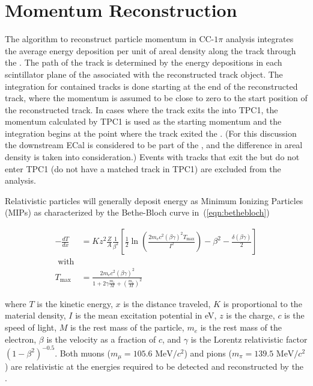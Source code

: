\section{Momentum Reconstruction}\label{subsec:MomRecon}

The algorithm to reconstruct particle momentum in CC-$1\pi$ analysis
integrates the average energy deposition per unit of areal density
along the track through the \podtext{}. The path of the track is determined
by the energy depositions in each scintillator plane of the \podtext{}
associated with the reconstructed track object. The integration for
contained tracks is done starting at the end of the reconstructed
track, where the momentum is assumed to be close to zero to the start
position of the reconstructed track. In cases where the track exits
the \podtext{} into TPC1, the momentum calculated by TPC1 is used as the
starting momentum and the integration begins at the point where the
track exited the \podtext{}. (For this discussion the downstream ECal is
considered to be part of the \podtext{}, and the difference in areal density
is taken into consideration.) Events with tracks that exit the \podtext{}
but do not enter TPC1 (do not have a matched track in TPC1) are
excluded from the analysis.


Relativistic particles will generally deposit energy as Minimum
Ionizing Particles (MIPs) as characterized by the Bethe-Bloch curve in~(\ref{eqn:bethebloch})

\begin{align}\label{eqn:bethebloch}
    -\frac{dT}{dx} &= K z^2\frac{Z}{A} \frac{1}{\beta^2}\left[\frac{1}{2}\ln\left(\frac{2 m_{e}c^{2}{(\beta\gamma)}^{2}T_\text{max}}{I^2}\right) - \beta^{2} - \frac{\delta\left(\beta\gamma\right)}{2}\right] \\
    \text{~with} \nonumber \\
    T_\text{max} &= \frac{2 m_{e}c^{2}{(\beta\gamma)}^{2}}{1+2\gamma \frac{m_e}{M} + {\left(\frac{m_e}{M}\right)}^2} \nonumber
\end{align}

\noindent{}where $T$ is the kinetic energy, $x$ is the distance
traveled, $K$ is proportional to the material density, $I$ is the mean
excitation potential in eV, $z$ is the charge, $c$ is the speed of
light, $M$ is the rest mass of the particle, $m_{e}$ is the rest mass
of the electron, $\beta$ is the velocity as a fraction of $c$, and
$\gamma$ is the Lorentz relativistic factor
${\left(1-\beta^{2}\right)}^{-0.5}$.  Both muons ($m_{\mu} =
105.6\text{~MeV}/c^{2}$) and pions ($m_{\pi} = 139.5
\text{~MeV}/c^{2}$) are relativistic at the energies required to be
detected and reconstructed by the \podtext{}.

